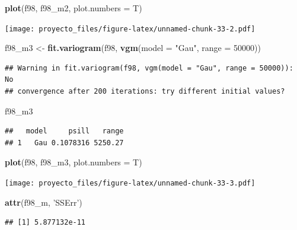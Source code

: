 \documentclass[11pt,]{article}
\newenvironment{Shaded}{\begin{snugshade}}{\end{snugshade}}
\newcommand{\KeywordTok}[1]{\textcolor[rgb]{0.13,0.29,0.53}{\textbf{#1}}}
\newcommand{\DataTypeTok}[1]{\textcolor[rgb]{0.13,0.29,0.53}{#1}}
\newcommand{\DecValTok}[1]{\textcolor[rgb]{0.00,0.00,0.81}{#1}}
\newcommand{\StringTok}[1]{\textcolor[rgb]{0.31,0.60,0.02}{#1}}
\newcommand{\NormalTok}[1]{#1}
\begin{document}
\begin{Shaded}
\begin{Highlighting}[]
\KeywordTok{plot}\NormalTok{(f98, f98_m2, }\DataTypeTok{plot.numbers =}\NormalTok{ T)}
\end{Highlighting}
\end{Shaded}

\texttt{[image: proyecto\_files/figure-latex/unnamed-chunk-33-2.pdf]}

\begin{Shaded}
\begin{Highlighting}[]
\NormalTok{f98_m3 <-}\StringTok{ }\KeywordTok{fit.variogram}\NormalTok{(f98, }\KeywordTok{vgm}\NormalTok{(}\DataTypeTok{model =} \StringTok{"Gau"}\NormalTok{, }\DataTypeTok{range =} \DecValTok{50000}\NormalTok{))}
\end{Highlighting}
\end{Shaded}

\begin{verbatim}
## Warning in fit.variogram(f98, vgm(model = "Gau", range = 50000)): No
## convergence after 200 iterations: try different initial values?
\end{verbatim}

\begin{Shaded}
\begin{Highlighting}[]
\NormalTok{f98_m3}
\end{Highlighting}
\end{Shaded}

\begin{verbatim}
##   model     psill   range
## 1   Gau 0.1078316 5250.27
\end{verbatim}

\begin{Shaded}
\begin{Highlighting}[]
\KeywordTok{plot}\NormalTok{(f98, f98_m3, }\DataTypeTok{plot.numbers =}\NormalTok{ T)}
\end{Highlighting}
\end{Shaded}

\texttt{[image: proyecto\_files/figure-latex/unnamed-chunk-33-3.pdf]}

\begin{Shaded}
\begin{Highlighting}[]
\KeywordTok{attr}\NormalTok{(f98_m, }\StringTok{'SSErr'}\NormalTok{)}
\end{Highlighting}
\end{Shaded}

\begin{verbatim}
## [1] 5.877132e-11
\end{verbatim}
\end{document}
